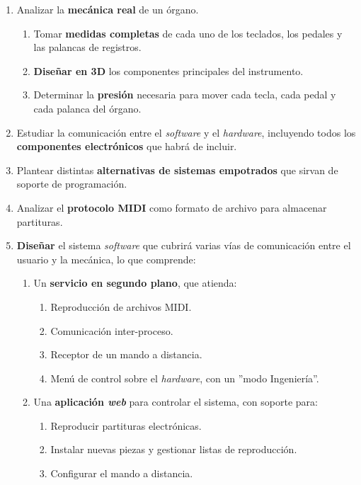\begin{enumerate}
	\item Analizar la \textbf{mecánica real} de un órgano.
	
	\begin{enumerate}
		\item Tomar \textbf{medidas completas} de cada uno de los teclados, los pedales y las palancas de registros.
		\item \textbf{Diseñar en 3D} los componentes principales del instrumento.
		\item Determinar la \textbf{presión} necesaria para mover cada tecla, cada pedal y cada palanca del órgano.
	\end{enumerate}
	
	\item Estudiar la comunicación entre el \textit{software} y el \textit{hardware}, incluyendo todos los \textbf{componentes electrónicos} que habrá de incluir.
	
	\item Plantear distintas \textbf{alternativas de sistemas empotrados} que sirvan de soporte de programación.
	
	\item Analizar el \textbf{protocolo \acrshort{MIDI}} como formato de archivo para almacenar partituras.
	
	\item \textbf{Diseñar} el sistema \textit{software} que cubrirá varias vías de comunicación entre el usuario y la mecánica, lo que comprende:
	
	\begin{enumerate}
		\item Un \textbf{servicio en segundo plano}, que atienda:
		
		\begin{enumerate}
			\item Reproducción de archivos \acrshort{MIDI}.
			\item Comunicación inter-proceso.
			\item Receptor de un mando a distancia.
			\item Menú de control sobre el \textit{hardware}, con un ''modo Ingeniería''.
		\end{enumerate}
		
		\item Una \textbf{aplicación \textit{web}} para controlar el sistema, con soporte para:
		
		\begin{enumerate}
			\item Reproducir partituras electrónicas.
			\item Instalar nuevas piezas y gestionar listas de reproducción.
			\item Configurar el mando a distancia.
		\end{enumerate}
		

\end{enumerate}
\end{enumerate}
